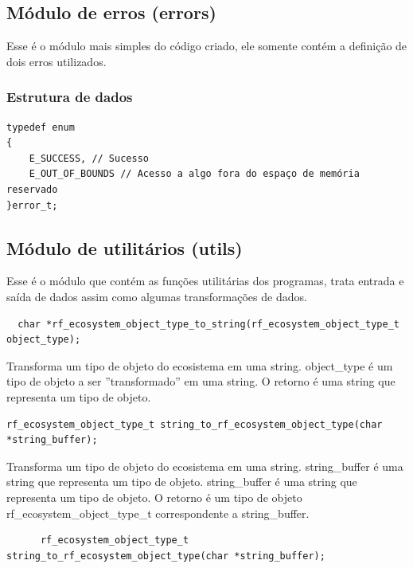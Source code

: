 \documentclass[12pt]{article}
\begin{document}
\subsection{Módulo de erros (errors)}

Esse é o módulo mais simples do código criado, ele somente contém a definição de dois erros utilizados.

\subsubsection{Estrutura de dados}

\begin{verbatim}
typedef enum
{
    E_SUCCESS, // Sucesso
    E_OUT_OF_BOUNDS // Acesso a algo fora do espaço de memória reservado
}error_t;
\end{verbatim}

\subsection{Módulo de utilitários (utils)}

Esse é o módulo que contém as funções utilitárias dos programas, trata entrada e saída de dados assim como algumas transformações de dados.


\begin{verbatim}
  char *rf_ecosystem_object_type_to_string(rf_ecosystem_object_type_t object_type);
\end{verbatim}

Transforma um tipo de objeto do ecosistema em uma string. object\_type é um tipo de objeto a ser ''transformado'' em uma string. O retorno é uma string que representa um tipo de objeto.

\begin{verbatim}
rf_ecosystem_object_type_t string_to_rf_ecosystem_object_type(char *string_buffer);
\end{verbatim}

Transforma um tipo de objeto do ecosistema em uma string. string\_buffer é uma string que representa um tipo de objeto. string\_buffer é uma string que representa um tipo de objeto. O retorno é um tipo de objeto rf\_ecosystem\_object\_type\_t correspondente a string\_buffer.

\begin{verbatim}
      rf_ecosystem_object_type_t string_to_rf_ecosystem_object_type(char *string_buffer);
      \end{verbatim}
\end{document}
